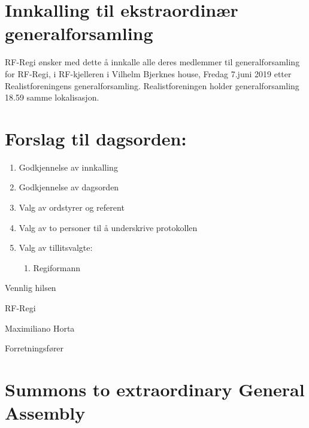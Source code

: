 \documentclass[a4paper]{article}
\begin{document}
\section*{\textsf{\textbf{\Large{Innkalling til ekstraordinær generalforsamling}}}}
\vspace{1cm}

RF-Regi ønsker med dette å innkalle alle deres medlemmer til generalforsamling
for RF-Regi, i RF-kjelleren i Vilhelm Bjerknes house, Fredag 7.juni 2019 etter Realistforeningens 
generalforsamling. Realistforeningen holder generalforsamling 18.59 samme lokalisasjon.\\

\section*{\textsf{\large{Forslag til dagsorden:}}}
\begin{enumerate}
    \item Godkjennelse av innkalling
    \item Godkjennelse av dagsorden
    \item Valg av ordstyrer og referent
    \item Valg av to personer til å underskrive protokollen
    \item Valg av tillitsvalgte:
    \begin{enumerate}
        \item Regiformann
    \end{enumerate}
\end{enumerate}

\vspace{2.5cm}

Vennlig hilsen

RF-Regi

Maximiliano Horta

Forretningsfører

\newpage

\section*{\textsf{\textbf{\Large{Summons to extraordinary General Assembly}}}}
\vspace{1cm}
\end{document}
